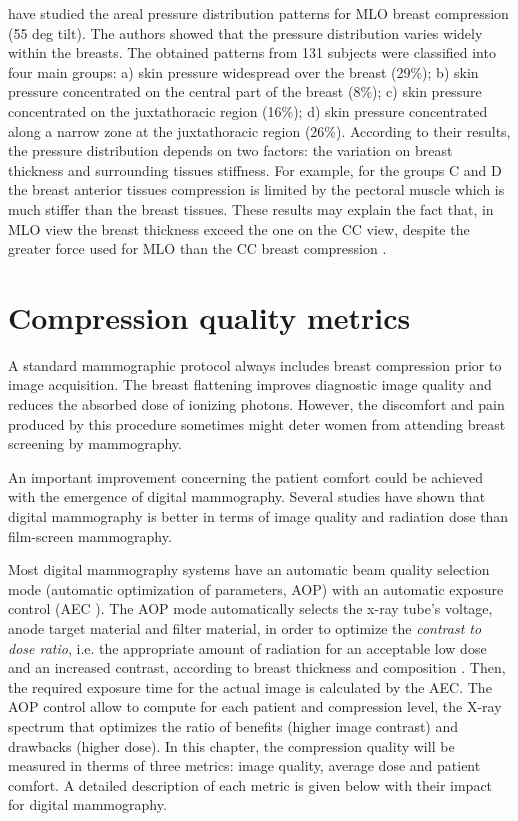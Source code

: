 \cite{dustler_breast_2012} have studied the areal pressure distribution patterns for MLO breast compression (55 deg tilt). The authors showed that the pressure distribution varies widely within the breasts. The obtained patterns from 131 subjects were classified into four main groups: a) skin pressure widespread over the breast (29\%); b) skin pressure concentrated on the central part of the breast (8\%); c) skin pressure concentrated on the juxtathoracic region (16\%); d) skin pressure concentrated along a narrow zone at the juxtathoracic region (26\%). According to their results, the pressure distribution depends on two factors: the variation on breast thickness and surrounding tissues stiffness. For example, for the groups C and D the breast  anterior tissues compression is limited by the pectoral muscle which is much stiffer than the breast tissues.  These results may explain the fact that, in MLO view the breast thickness exceed the one on the CC view, despite the greater force used for MLO than the CC breast compression \citep{mercer_practitioner_2013, helvie_breast_1994}. 



\section{Compression quality metrics}
A standard mammographic protocol always includes breast compression prior to image acquisition. The breast flattening improves diagnostic image quality and reduces the absorbed dose of ionizing photons. However, the discomfort and pain produced by this procedure sometimes might deter women from attending breast screening by mammography. 

An important improvement concerning  the patient comfort could be achieved with the emergence of digital mammography.  Several studies have shown that digital mammography is better in terms of image quality \citep{obenauer_screen_2002} and radiation dose \citep{chen_analysis_2012} than film-screen mammography.

Most digital mammography systems have an automatic beam quality selection mode (automatic optimization of parameters, AOP) with an automatic exposure control (AEC ). The AOP mode automatically selects the  x-ray  tube’s  voltage,  anode  target  material  and  filter  material, in order to optimize the \textit{contrast to dose ratio}, i.e. the appropriate amount of radiation for an acceptable low dose and an increased contrast, according to breast thickness and composition \citep{williams_optimization_2008}. Then, the  required  exposure  time  for  the  actual  image  is  calculated  by  the  AEC.  The AOP control allow to compute for each patient and compression level,  the X-ray spectrum that optimizes  the  ratio of benefits  (higher image contrast) and  drawbacks  (higher  dose). 
In this chapter, the compression quality will be measured in therms of three metrics: image quality, average dose and patient comfort. A detailed description of each metric is given below with their impact for digital  mammography. 

